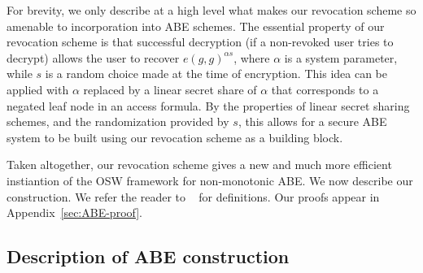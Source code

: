 \documentclass[a4paper, 11pt]{article}
\newcommand{\comment}[1]{}
\newcommand{\Z}{\ensuremath{\mathbb{Z}}}
\newcommand{\G}{\ensuremath{\mathbb{G}}}
\theoremstyle{definition}
\newcommand{\Zp}{\ensuremath{{\Z_p}}}
\newcommand{\s}[1]{{\scriptscriptstyle{#1}}}
\newcommand{\PK}{\ensuremath{\textrm{PK}}}
\begin{document}
For brevity, we only describe
at a high level what makes our revocation scheme so amenable to
incorporation into ABE schemes.  The essential property of our
revocation scheme is that successful decryption (if a non-revoked user
tries to decrypt) allows the user to recover $e(g,g)^{\alpha s}$,
where $\alpha$ is a system parameter, while $s$ is a random choice
made at the time of encryption.  This idea can be applied with
$\alpha$ replaced by a linear secret share of $\alpha$ that
corresponds to a negated leaf node in an access formula.  By the
properties of linear secret sharing schemes, and the randomization
provided by $s$, this allows for a secure ABE system to be built using
our revocation scheme as a building block.

Taken altogether, our revocation scheme gives a new and much more
efficient instiantion of the OSW framework for non-monotonic ABE.  We
now describe our construction. We refer the reader to ~\cite{OSW07}
for definitions. Our proofs appear in Appendix~\ref{sec:ABE-proof}.


\subsection{Description of ABE construction}


\newcommand{\zkip}{{\textsc{zkip}}}
\newcommand{\vci}{{\textsc{vci}}}
\newcommand{\fip}{{\textsc{fip}}}
\newcommand{\start}{{\small{START}}}
\newcommand{\transcript}{{\small{TRANSCRIPT}}}
\newcommand{\adv}{{\textbf{Adv}}}
\newcommand{\expe}{{\textbf{Exp}}}
\newcommand{\hash}{$\mathcal{H}$}
\newcommand{\pe}{$\mathcal{PE}$}
\newcommand{\enc}{$\mathcal{E}$}
\newcommand{\dec}{$\mathcal{D}$}
\newcommand{\key}{$\mathcal{K}$}
\newcommand{\GT}{\ensuremath{\mathbb{G}_T}}
\newcommand{\univ}{\mathcal{U}}
\newcommand{\zz}{\mathbb{Z}}
\newcommand{\parent}{\mathrm{parent}}
\newcommand{\sons}{\mathrm{CHILD}}
\newcommand{\ind}{\mathrm{index}}
\newcommand{\att}{\mathrm{att}}
\newcommand{\ghat}{e(g,g)}
\newcommand{\msp}{\mathrm{MSP}}

\newcommand{\MK}{\ensuremath{\textrm{MK}}}


\newcommand{\Decnode}{\ensuremath{\mathrm{DecryptNode}}}
\newcommand{\PolySat}{\ensuremath{\mathrm{PolySat}}}
\newcommand{\PolyUnsat}{\ensuremath{\mathrm{PolyUnsat}}}
\end{document}
